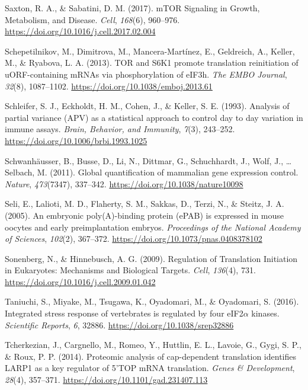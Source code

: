 \documentclass[12pt,openany]{book}
\begin{document}
\hypertarget{ref-Saxton2017}{}
Saxton, R. A., \& Sabatini, D. M. (2017). mTOR Signaling in Growth,
Metabolism, and Disease. \emph{Cell}, \emph{168}(6), 960--976.
\url{https://doi.org/10.1016/j.cell.2017.02.004}

\hypertarget{ref-Schepetilnikov2013}{}
Schepetilnikov, M., Dimitrova, M., Mancera-Martínez, E., Geldreich, A.,
Keller, M., \& Ryabova, L. A. (2013). TOR and S6K1 promote translation
reinitiation of uORF-containing mRNAs via phosphorylation of eIF3h.
\emph{The EMBO Journal}, \emph{32}(8), 1087--1102.
\url{https://doi.org/10.1038/emboj.2013.61}

\hypertarget{ref-Schleifer1993}{}
Schleifer, S. J., Eckholdt, H. M., Cohen, J., \& Keller, S. E. (1993).
Analysis of partial variance (APV) as a statistical approach to control
day to day variation in immune assays. \emph{Brain, Behavior, and
Immunity}, \emph{7}(3), 243--252.
\url{https://doi.org/10.1006/brbi.1993.1025}

\hypertarget{ref-Schwanhausser2011}{}
Schwanhäusser, B., Busse, D., Li, N., Dittmar, G., Schuchhardt, J.,
Wolf, J., \ldots{} Selbach, M. (2011). Global quantification of
mammalian gene expression control. \emph{Nature}, \emph{473}(7347),
337--342. \url{https://doi.org/10.1038/nature10098}

\hypertarget{ref-Seli2005}{}
Seli, E., Lalioti, M. D., Flaherty, S. M., Sakkas, D., Terzi, N., \&
Steitz, J. A. (2005). An embryonic poly(A)-binding protein (ePAB) is
expressed in mouse oocytes and early preimplantation embryos.
\emph{Proceedings of the National Academy of Sciences}, \emph{102}(2),
367--372. \url{https://doi.org/10.1073/pnas.0408378102}

\hypertarget{ref-Sonenberg2009}{}
Sonenberg, N., \& Hinnebusch, A. G. (2009). Regulation of Translation
Initiation in Eukaryotes: Mechanisms and Biological Targets.
\emph{Cell}, \emph{136}(4), 731.
\url{https://doi.org/10.1016/j.cell.2009.01.042}

\hypertarget{ref-Taniuchi2016}{}
Taniuchi, S., Miyake, M., Tsugawa, K., Oyadomari, M., \& Oyadomari, S.
(2016). Integrated stress response of vertebrates is regulated by four
eIF2\(\alpha\) kinases. \emph{Scientific Reports}, \emph{6}, 32886.
\url{https://doi.org/10.1038/srep32886}

\hypertarget{ref-Tcherkezian2014}{}
Tcherkezian, J., Cargnello, M., Romeo, Y., Huttlin, E. L., Lavoie, G.,
Gygi, S. P., \& Roux, P. P. (2014). Proteomic analysis of cap-dependent
translation identifies LARP1 as a key regulator of 5'TOP mRNA
translation. \emph{Genes \& Development}, \emph{28}(4), 357--371.
\url{https://doi.org/10.1101/gad.231407.113}
\end{document}

